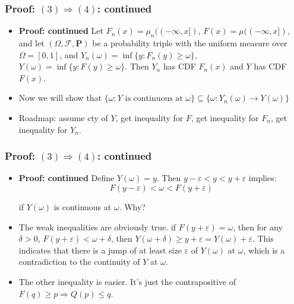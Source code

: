 \documentclass[handout]{beamer}
\newcommand{\BP}{\mathbf{P}}
\begin{document}
\frame
{
  \frametitle{Proof: $(3) \Rightarrow (4)$: continued} 

\begin{itemize}
          
                     
\item<1-> \textbf{Proof: continued} Let $F_n(x)=\mu_n((-\infty, x])$, $F(x)=\mu((-\infty, x])$, and let $(\Omega, \mathcal{F}, \BP)$ be a probability triple with the uniform measure over $\Omega=[0,1]$, and $Y_n(\omega)=\inf \{y: F_n(y) \geq \omega\}$, $Y(\omega)=\inf \{y: F(y) \geq \omega\}$. Then $Y_n$ has CDF $F_n(x)$ and $Y$ has CDF $F(x)$.  
                     
                     
    \item<2->[-] Now we will show that $\{\omega : Y \text{ is continuous at } \omega\} \subseteq  \{ \omega : Y_n(\omega) \rightarrow Y(\omega)\}$ 
                     
\item<3->[-] Roadmap: assume cty of $Y$, get inequality for $F$, get inequality for $F_n$, get inequality for $Y_n$. 

                                         
\end{itemize}
}





\frame
{
  \frametitle{Proof: $(3) \Rightarrow (4)$: continued} 

\begin{itemize}
          
\item<1-> \textbf{Proof: continued} Define $Y(\omega) = y$. Then $y-\varepsilon<y< y+\varepsilon$ implies:
                                                  $$F(y-\varepsilon)< \omega < F(y+\varepsilon) $$
                         
if $Y(\omega)$ is continuous at $\omega$. Why?
                         
                   
\item<2-> The weak inequalities are obviously true. if $F(y+\varepsilon)=\omega$, then for any $\delta>0$, $F(y+\varepsilon)<\omega+\delta$, then $Y(\omega+\delta) \ge y+\varepsilon=Y(\omega)+\varepsilon$. This indicates that there is a jump of at least size $\varepsilon$ of $Y(\omega)$ at $\omega$, which is a contradiction to the continuity of $Y$ at $\omega$. 
                   
\item<3-> The other inequality is easier. It's just the contrapositive of $F(q)\geq p \Rightarrow Q(p)\leq q $.

                                         
\end{itemize}
}
\end{document}
